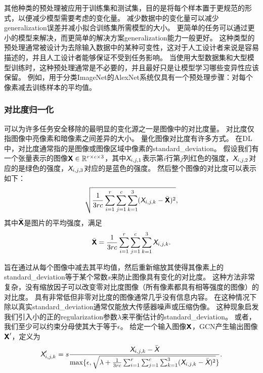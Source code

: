 其他种类的预处理被应用于训练集和测试集，目的是将每个样本置于更规范的形式，以便减少模型需要考虑的变化量。
减少数据中的变化量可以减少\gls{generalization}误差并减小拟合训练集所需模型的大小。
更简单的任务可以通过更小的模型来解决，而更简单的解决方案\gls{generalization}能力一般更好。
这种类型的预处理通常被设计为去除输入数据中的某种可变性，这对于人工设计者来说是容易描述的，并且人工设计者能够保证不受到任务影响。
当使用大型数据集和大型模型训练时，这种预处理通常是不必要的，并且最好只是让模型学习哪些变异性应该保留。%
例如，用于分类ImageNet的AlexNet系统仅具有一个预处理步骤：对每个像素减去训练样本的平均值\citep{Krizhevsky-2012}。

\subsubsection{对比度归一化}
\label{sec:contrast_normalization}

可以为许多任务安全移除的最明显的变化源之一是图像中的对比度量。
对比度仅指图像中亮像素和暗像素之间差异的大小。
量化图像对比度有许多方式。
在\gls{DL}中，对比度通常指的是图像或图像区域中像素的\gls{standard_deviation}。
假设我们有一个张量表示的图像$\textsf{\textbf{X}} \in\mathbb{R}^{r\times c\times 3}$，其中$\textit{\textsf{X}}_{i,j,1}$表示第$i$行第$j$列红色的强度，$\textit{\textsf{X}}_{i,j,2}$对应的是绿色的强度，$\textit{\textsf{X}}_{i,j,3}$对应的是蓝色的强度。
然后整个图像的对比度可以表示如下：
\begin{align}
\label{eqn:121}
\sqrt{\frac{1}{3rc}\sum_{i=1}^{r} \sum_{j=1}^{c}\sum_{k=1}^{3} (\textit{\textsf{X}}_{i,j,k} - \bar{\textsf{\textbf{X}}} )^2},
\end{align}
其中$\bar{\textsf{\textbf{X}}}$是图片的平均强度，满足
\begin{align}
\label{eqn:122}
 \bar{\textsf{\textbf{X}}} =  \frac{1}{3rc}\sum_{i=1}^{r} \sum_{j=1}^{c}\sum_{k=1}^{3}\textit{\textsf{X}}_{i,j,k}.
\end{align}


旨在通过从每个图像中减去其平均值，然后重新缩放其使得其像素上的\gls{standard_deviation}等于某个常数$s$来防止图像具有变化的对比度。
这种方法非常复杂，没有缩放因子可以改变零对比度图像（所有像素都具有相等强度的图像）的对比度。
具有非常低但非零对比度的图像通常几乎没有信息内容。
在这种情况下除以真实\gls{standard_deviation}通常仅能放大传感器噪声或压缩伪像。
这种现象启发我们引入小的正的\gls{regularization}参数$\lambda$来平衡估计的\gls{standard_deviation}。
或者，我们至少可以约束分母使其大于等于$\epsilon$。
给定一个输入图像$\textsf{\textbf{X}}$，\gls{GCN}产生输出图像$\textsf{\textbf{X}}'$，定义为
\begin{align}
\label{eqn:123}
\textit{\textsf{X}}'_{i,j,k} = s\frac{\textit{\textsf{X}}_{i,j,k} - \bar{\textit{\textsf{X}}}}{\max\{ \epsilon, \sqrt{ \lambda + {\frac{1}{3rc}\sum_{i=1}^{r}\sum_{j=1}^{c}\sum_{k=1}^{3}} (\textit{\textsf{X}}_{i,j,k} - \bar{\textit{\textsf{X}}} )^2} \}}.
\end{align}


